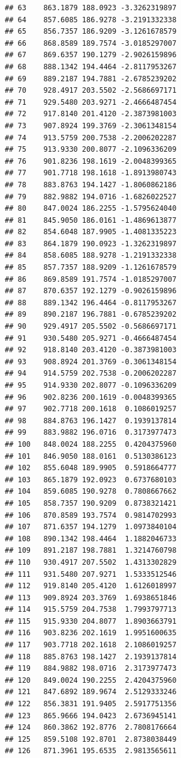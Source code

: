 \documentclass[
]{article}
\begin{document}
\begin{verbatim}
## 63    863.1879 188.0923 -3.3262319897
## 64    857.6085 186.9278 -3.2191332338
## 65    856.7357 186.9209 -3.1261678579
## 66    868.8589 189.7574 -3.0185297007
## 67    869.6357 190.1279 -2.9026159896
## 68    888.1342 194.4464 -2.8117953267
## 69    889.2187 194.7881 -2.6785239202
## 70    928.4917 203.5502 -2.5686697171
## 71    929.5480 203.9271 -2.4666487454
## 72    917.8140 201.4120 -2.3873981003
## 73    907.8924 199.3769 -2.3061348154
## 74    913.5759 200.7538 -2.2006202287
## 75    913.9330 200.8077 -2.1096336209
## 76    901.8236 198.1619 -2.0048399365
## 77    901.7718 198.1618 -1.8913980743
## 78    883.8763 194.1427 -1.8060862186
## 79    882.9882 194.0716 -1.6826022527
## 80    847.0024 186.2255 -1.5795624040
## 81    845.9050 186.0161 -1.4869613877
## 82    854.6048 187.9905 -1.4081335223
## 83    864.1879 190.0923 -1.3262319897
## 84    858.6085 188.9278 -1.2191332338
## 85    857.7357 188.9209 -1.1261678579
## 86    869.8589 191.7574 -1.0185297007
## 87    870.6357 192.1279 -0.9026159896
## 88    889.1342 196.4464 -0.8117953267
## 89    890.2187 196.7881 -0.6785239202
## 90    929.4917 205.5502 -0.5686697171
## 91    930.5480 205.9271 -0.4666487454
## 92    918.8140 203.4120 -0.3873981003
## 93    908.8924 201.3769 -0.3061348154
## 94    914.5759 202.7538 -0.2006202287
## 95    914.9330 202.8077 -0.1096336209
## 96    902.8236 200.1619 -0.0048399365
## 97    902.7718 200.1618  0.1086019257
## 98    884.8763 196.1427  0.1939137814
## 99    883.9882 196.0716  0.3173977473
## 100   848.0024 188.2255  0.4204375960
## 101   846.9050 188.0161  0.5130386123
## 102   855.6048 189.9905  0.5918664777
## 103   865.1879 192.0923  0.6737680103
## 104   859.6085 190.9278  0.7808667662
## 105   858.7357 190.9209  0.8738321421
## 106   870.8589 193.7574  0.9814702993
## 107   871.6357 194.1279  1.0973840104
## 108   890.1342 198.4464  1.1882046733
## 109   891.2187 198.7881  1.3214760798
## 110   930.4917 207.5502  1.4313302829
## 111   931.5480 207.9271  1.5333512546
## 112   919.8140 205.4120  1.6126018997
## 113   909.8924 203.3769  1.6938651846
## 114   915.5759 204.7538  1.7993797713
## 115   915.9330 204.8077  1.8903663791
## 116   903.8236 202.1619  1.9951600635
## 117   903.7718 202.1618  2.1086019257
## 118   885.8763 198.1427  2.1939137814
## 119   884.9882 198.0716  2.3173977473
## 120   849.0024 190.2255  2.4204375960
## 121   847.6892 189.9674  2.5129333246
## 122   856.3831 191.9405  2.5917751356
## 123   865.9666 194.0423  2.6736945141
## 124   860.3862 192.8776  2.7808176664
## 125   859.5108 192.8701  2.8738038449
## 126   871.3961 195.6535  2.9813565611

\end{verbatim}
\end{document}
